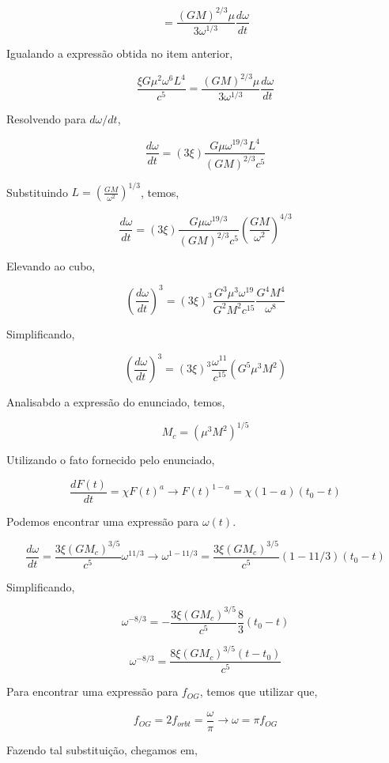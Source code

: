 \documentclass[11pt]{article}
\begin{document}
\begin{pproblem}
\begin{pssolution*}{}{}
\begin{alternativas}
        \[= \frac{(GM)^{2/3}\mu}{3\omega^{1/3}}\frac{d\omega}{dt}\]

        Igualando a expressão obtida no item anterior, 

        \[\frac{\xi G\mu^2\omega^6L^4}{c^5} = \frac{(GM)^{2/3}\mu}{3\omega^{1/3}}\frac{d\omega}{dt}\]

        Resolvendo para \(d\omega/dt\), 
        
        \[\frac{d\omega }{dt} = (3\xi)\frac{G\mu \omega^{19/3}L^4}{(GM)^{2/3}c^5}\]

        Substituindo \(L = \left(\frac{GM}{\omega^2}\right)^{1/3}\), temos, 

        \[\frac{d\omega}{dt} = (3\xi)\frac{G\mu \omega^{19/3}}{(GM)^{2/3}c^5}\left(\frac{GM}{\omega^2}\right)^{4/3}\]

        Elevando ao cubo, 

        \[\left(\frac{d\omega}{dt}\right)^{3} = (3\xi)^3\frac{G^3\mu^3\omega^{19}}{G^2M^2c^{15}}\frac{G^4M^4}{\omega^8}\]

        Simplificando, 

        \[\boxed{\left(\frac{d\omega}{dt}\right)^3 = (3\xi)^3\frac{\omega^{11}}{c^{{15}}}(G^5\mu^3M^2)}\]

        Analisabdo a expressão do enunciado, temos, 

        \[\boxed{M_c = (\mu^3 M^2)^{1/5}}\]

        \item Utilizando o fato fornecido pelo enunciado, 
        
        \[\frac{d F(t)}{dt} = \chi F(t)^a \rightarrow F(t)^{1-a} = \chi (1-a)(t_0-t)\]

        Podemos encontrar uma expressão para \(\omega(t)\).

        \[\frac{d\omega}{dt} = \frac{3\xi (GM_c)^{3/5}}{c^5}\omega^{11/3} \rightarrow \omega^{1-11/3} = \frac{3\xi (GM_c)^{3/5}}{c^5}(1-11/3)(t_0-t)\]

        Simplificando, 

        \[\omega ^{-8/3} = -\frac{3\xi (GM_c)^{3/5}}{c^5}\frac{8}{3}(t_0-t)\]

        \[\omega^{-8/3} = \frac{8\xi (GM_c)^{3/5}(t-t_0)}{c^5}\]

        Para encontrar uma expressão para \(f_{OG}\), temos que utilizar que, 

        \[f_{OG} = 2f_{orbt} = \frac{\omega}{\pi}\rightarrow \omega = \pi f_{OG}\]

        Fazendo tal substituição, chegamos em, 



\end{alternativas}
\end{pssolution*}
\end{pproblem}
\end{document}
